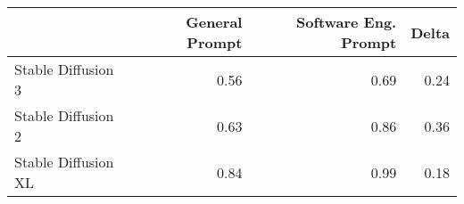 \begin{tabular}{lrrr}
\toprule
 & General Prompt & Software Eng. Prompt & Delta \\
\midrule
Stable Diffusion 3 & 0.56 & 0.69 & 0.24 \\
Stable Diffusion 2 & 0.63 & 0.86 & 0.36 \\
Stable Diffusion XL & 0.84 & 0.99 & 0.18 \\
\bottomrule
\end{tabular}
